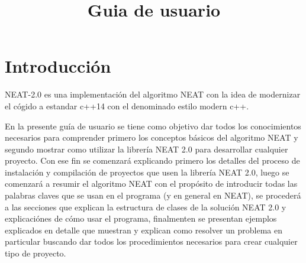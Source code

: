 \documentclass[11pt]{article}
\title{Guia de usuario}
\begin{document}
\maketitle

\newpage 

\section {Introducción}

NEAT-2.0 es una implementación del algoritmo NEAT con la idea de modernizar el cógido a estandar c++14 con el denominado estilo modern c++. \newline


En la presente guía de usuario se tiene como objetivo dar todos los conocimientos necesarios para comprender primero los conceptos básicos del algoritmo NEAT y segundo mostrar como utilizar la librería NEAT 2.0 para desarrollar cualquier proyecto. Con ese fin se comenzará explicando primero los detalles del proceso de instalación y compilación de proyectos que usen la librería NEAT 2.0, luego se comenzará a resumir el algoritmo NEAT con el propósito de introducir todas las palabras claves que se usan en el programa (y en general en NEAT), se procederá a las secciones que explican la estructura de clases de la solución NEAT 2.0 y explicaciónes de cómo usar el programa, finalmenten se presentan ejemplos explicados en detalle que muestran y explican como resolver un problema en particular buscando dar todos los procedimientos necesarios para crear cualquier tipo de proyecto.






\newpage




% 
\end{document}
